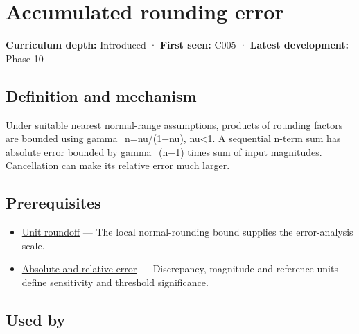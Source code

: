 \hypertarget{appendix-f82e270791c8}{}\label{referencestart:appendix-f82e270791c8}
\section{Accumulated rounding error}\label{appendix-f82e270791c8-accumulated-rounding-error}

\hypertarget{appendix-f82e270791c8-accumulated-rounding-error}{}

\textbf{Curriculum depth:} Introduced · \textbf{First seen:} C005 · \textbf{Latest development:} Phase 10

\begin{allmightroledefinition}

\subsection{Definition and mechanism}\label{appendix-f82e270791c8-definition-and-mechanism}

\hypertarget{appendix-f82e270791c8-definition-and-mechanism}{}

Under suitable nearest normal-range assumptions, products of rounding factors are bounded using gamma\_n=nu/(1−nu), nu\textless1. A sequential n-term sum has absolute error bounded by gamma\_(n−1) times sum of input magnitudes. Cancellation can make its relative error much larger.

\end{allmightroledefinition}

\subsection{Prerequisites}\label{appendix-f82e270791c8-prerequisites}

\hypertarget{appendix-f82e270791c8-prerequisites}{}

\begin{itemize}
\tightlist
\item
  \hyperref[appendix-bc44f7b42f42]{Unit roundoff} --- The local normal-rounding bound supplies the error-analysis scale.
\item
  \hyperref[appendix-3ae74e89b4e6]{Absolute and relative error} --- Discrepancy, magnitude and reference units define sensitivity and threshold significance.
\end{itemize}

\subsection{Used by}\label{appendix-f82e270791c8-used-by}

